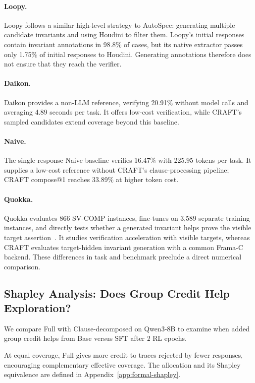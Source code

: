 \paragraph{Loopy.}
Loopy follows a similar high-level strategy to AutoSpec: generating multiple
candidate invariants and using Houdini to filter them.
Loopy's initial responses contain invariant annotations in 98.8\% of cases,
but its native extractor passes only 1.75\% of initial responses to Houdini.
Generating annotations therefore does not ensure that they reach the
verifier.

\paragraph{Daikon.}
Daikon provides a non-LLM reference, verifying 20.91\% without model calls
and averaging 4.89 seconds per task. It offers low-cost verification, while
CRAFT's sampled candidates extend coverage beyond this baseline.

\paragraph{Naive.}
The single-response Naive baseline verifies 16.47\% with 225.95 tokens per
task. It supplies a low-cost reference without CRAFT's clause-processing
pipeline; CRAFT compose@1 reaches 33.89\% at higher token cost.

\paragraph{Quokka.}
Quokka evaluates 866
SV-COMP instances, fine-tunes on 3,589 separate training instances, and
directly tests whether a generated invariant helps prove the visible target
assertion~\citep{wei2025invbench}. It studies verification acceleration with
visible targets, whereas CRAFT evaluates target-hidden invariant generation
with a common Frama-C backend. These differences in task and benchmark
preclude a direct numerical comparison.

\subsection{Shapley Analysis: Does Group Credit Help Exploration?}
\label{app:full-credit-analysis}

We compare Full with Clause-decomposed on Qwen3-8B to examine when added
group credit helps from Base versus SFT after 2 RL epochs.

At equal coverage, Full gives more credit to traces rejected by fewer
responses, encouraging complementary effective coverage.  The allocation
and its Shapley equivalence are defined in Appendix~\ref{app:formal-shapley}.


